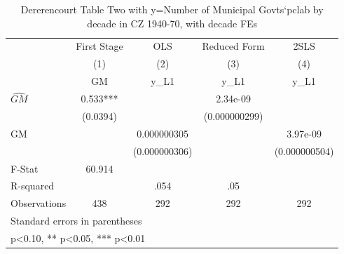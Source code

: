\begin{table}[htbp]\centering
\def\sym#1{\ifmmode^{#1}\else\(^{#1}\)\fi}
\caption{Dererencourt Table Two with y=Number of Municipal Govts`pclab by decade in CZ 1940-70, with decade FEs}
\begin{tabular}{l*{4}{c}}
\toprule
                    & First Stage   &         OLS   &Reduced Form   &        2SLS   \\
                    &\multicolumn{1}{c}{(1)}&\multicolumn{1}{c}{(2)}&\multicolumn{1}{c}{(3)}&\multicolumn{1}{c}{(4)}\\
                    &\multicolumn{1}{c}{GM}&\multicolumn{1}{c}{y\_L1}&\multicolumn{1}{c}{y\_L1}&\multicolumn{1}{c}{y\_L1}\\
\midrule
$\hat{GM}$          &       0.533***&               &    2.34e-09   &               \\
                    &    (0.0394)   &               &(0.000000299)   &               \\
\addlinespace
GM                  &               & 0.000000305   &               &    3.97e-09   \\
                    &               &(0.000000306)   &               &(0.000000504)   \\
\midrule
F-Stat              &      60.914   &               &               &               \\
R-squared           &               &        .054   &         .05   &               \\
Observations        &         438   &         292   &         292   &         292   \\
\bottomrule
\multicolumn{5}{l}{\footnotesize Standard errors in parentheses}\\
\multicolumn{5}{l}{\footnotesize * p<0.10, ** p<0.05, *** p<0.01}\\
\end{tabular}
\end{table}
